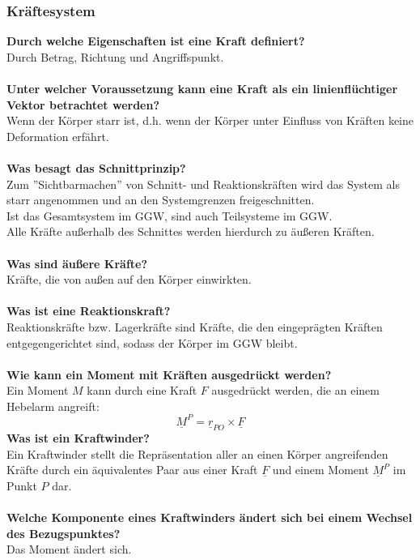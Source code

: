 \documentclass[a4paper,twocolumn,10pt]{article}
\begin{document}
\subsubsection{Kräftesystem}
\textbf{Durch welche Eigenschaften ist eine Kraft definiert?}\\
Durch Betrag, Richtung und Angriffspunkt.\\\\
\textbf{Unter welcher Voraussetzung kann eine Kraft als ein linienflüchtiger Vektor betrachtet werden?}\\
Wenn der Körper starr ist, d.h. wenn der Körper unter Einfluss von Kräften keine Deformation erfährt.\\\\
\textbf{Was besagt das Schnittprinzip?}\\
Zum ''Sichtbarmachen'' von Schnitt- und Reaktionskräften wird das System als starr angenommen und an den Systemgrenzen freigeschnitten.\\
Ist das Gesamtsystem im GGW, sind auch Teilsysteme im GGW.\\
Alle Kräfte außerhalb des Schnittes werden hierdurch zu äußeren Kräften.\\\\
\textbf{Was sind äußere Kräfte?}\\
Kräfte, die von außen auf den Körper einwirkten.\\\\
\textbf{Was ist eine Reaktionskraft?}\\
Reaktionskräfte bzw. Lagerkräfte sind Kräfte, die den eingeprägten Kräften entgegengerichtet sind, sodass der Körper im GGW bleibt.\\\\
\textbf{Wie kann ein Moment mit Kräften ausgedrückt werden?}\\
Ein Moment $M$ kann durch eine Kraft $F$ ausgedrückt werden, die an einem Hebelarm angreift:
\begin{equation*}
\underline{M}^P=\underline{r}_{PO}\times \underline{F}
\end{equation*}
\textbf{Was ist ein Kraftwinder?}\\
Ein Kraftwinder stellt die Repräsentation aller an einen Körper angreifenden Kräfte durch ein äquivalentes Paar aus einer Kraft $\underline{F}$ und einem Moment $\underline{M}^P$ im Punkt $P$ dar.\\\\
\textbf{Welche Komponente eines Kraftwinders ändert sich bei einem Wechsel des Bezugspunktes?}\\
Das Moment ändert sich.
\end{document}
